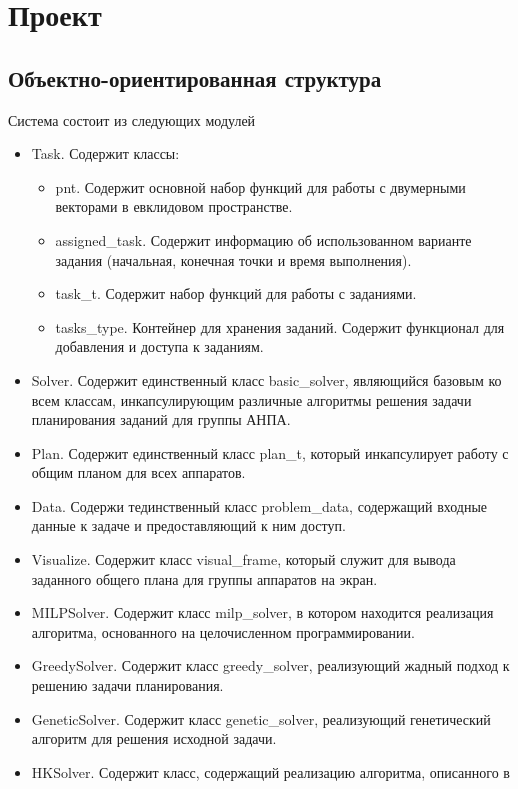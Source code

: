 \documentclass[a4paper,14pt,russian]{article}
\begin{document}
\section{Проект}
\subsection{Объектно-ориентированная структура}
Система состоит из следующих модулей
\begin{itemize}
\item Task. Содержит классы:
    \begin{itemize}
    \item pnt. Содержит основной набор функций для работы с двумерными векторами в евклидовом пространстве.
    \item assigned\_task. Содержит информацию об использованном варианте задания (начальная, конечная точки и время выполнения).
    \item task\_t. Содержит набор функций для работы с заданиями.
    \item tasks\_type. Контейнер для хранения заданий. Содержит функционал для добавления и доступа к заданиям.
    \end{itemize}
\item Solver. Содержит единственный класс basic\_solver, являющийся базовым ко всем классам, инкапсулирующим различные алгоритмы решения задачи планирования заданий для группы АНПА.
\item Plan. Содержит единственный класс plan\_t, который инкапсулирует работу с общим планом для всех аппаратов.
\item Data. Содержи тединственный класс problem\_data, содержащий входные данные к задаче и предоставляющий к ним доступ.
\item Visualize. Содержит класс visual\_frame, который служит для вывода заданного общего плана для группы аппаратов на экран.
\item MILPSolver. Содержит класс milp\_solver, в котором находится реализация алгоритма, основанного на целочисленном программировании.
\item GreedySolver. Содержит класс greedy\_solver, реализующий жадный подход к решению задачи планирования.
\item GeneticSolver. Содержит класс genetic\_solver, реализующий генетический алгоритм для решения исходной задачи.
\item HKSolver. Содержит класс, содержащий реализацию алгоритма, описанного в \cite{tuphanov1}
\end{itemize}
\end{document}
